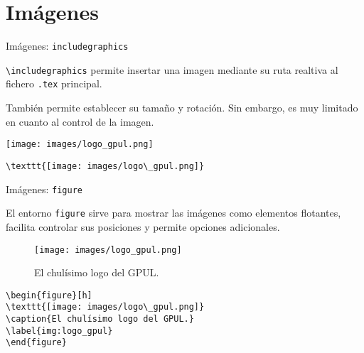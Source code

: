 \section{Imágenes}

\begin{frame}[fragile]{Imágenes: \texttt{includegraphics}}

\verb|\includegraphics| permite insertar una imagen mediante su ruta realtiva al fichero \texttt{.tex} principal. 

\vspace{0.5cm}

También permite establecer su tamaño y rotación. Sin embargo, es muy limitado en cuanto al control de la imagen.

\texttt{[image: images/logo\_gpul.png]}

\begin{verbatim}
\texttt{[image: images/logo\_gpul.png]}
\end{verbatim}
\end{frame}


\begin{frame}[fragile]{Imágenes: \texttt{figure}}

El entorno \texttt{figure} sirve para mostrar las imágenes como elementos flotantes, facilita controlar sus posiciones y permite opciones adicionales.

\begin{figure}[h]
\texttt{[image: images/logo\_gpul.png]}
\caption{El chulísimo logo del GPUL.}
\label{img:logo_gpul}
\end{figure}

\begin{verbatim}
\begin{figure}[h]
\texttt{[image: images/logo\_gpul.png]}
\caption{El chulísimo logo del GPUL.}
\label{img:logo_gpul}
\end{figure}
\end{verbatim}

\end{frame}
